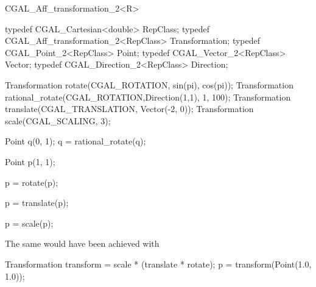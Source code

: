\begin{classtemplate}{CGAL_Aff_transformation_2<R>}
\begin{cprog}
  typedef CGAL_Cartesian<double> RepClass;
  typedef CGAL_Aff_transformation_2<RepClass> Transformation;
  typedef CGAL_Point_2<RepClass> Point;
  typedef CGAL_Vector_2<RepClass> Vector;
  typedef CGAL_Direction_2<RepClass> Direction;

  Transformation rotate(CGAL_ROTATION, sin(pi), cos(pi));
  Transformation rational_rotate(CGAL_ROTATION,Direction(1,1), 1, 100);
  Transformation translate(CGAL_TRANSLATION, Vector(-2, 0));
  Transformation scale(CGAL_SCALING, 3);

  Point q(0, 1);
  q = rational_rotate(q); 

  Point p(1, 1);

  p = rotate(p); 

  p = translate(p); 

  p = scale(p);
\end{cprog} 

The same would have been achieved with

\begin{cprog}

  Transformation transform = scale * (translate * rotate);
  p = transform(Point(1.0, 1.0));
\end{cprog} 
\end{classtemplate} 

